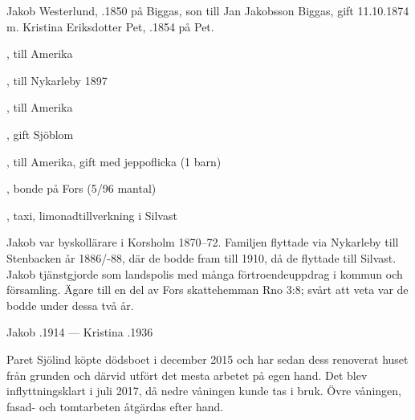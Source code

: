 Jakob Westerlund, .1850 på Biggas, son till Jan Jakobsson Biggas, gift 11.10.1874 m. Kristina Eriksdotter Pet, .1854 på Pet.
\begin{jhchildren}
  \item {}, till Amerika
  \item {}, till Nykarleby 1897
  \item {}, till Amerika
  \item {}, gift Sjöblom
  \item {}, till Amerika, gift med jeppoflicka (1 barn)
  \item {}, bonde på Fors (5/96 mantal)
  \item {}
  \item {}
  \item {}
  \item {}, taxi, limonadtillverkning i Silvast
\end{jhchildren}
Jakob var byskollärare i Korsholm 1870--72. Familjen flyttade via Nykarleby till Stenbacken år 1886/-88, där de bodde fram till 1910, då de flyttade till Silvast. Jakob tjänstgjorde som landspolis med många förtroendeuppdrag i kommun och församling. Ägare till en del av Fors skattehemman Rno 3:8; svårt att veta var de bodde under dessa två år.

Jakob .1914  --- Kristina .1936






Paret Sjölind köpte dödsboet i december 2015 och har sedan dess renoverat huset från grunden och därvid utfört det mesta arbetet på egen hand. Det blev inflyttningsklart i juli 2017, då nedre våningen kunde tas i bruk. Övre våningen, fasad- och tomtarbeten åtgärdas efter hand.

